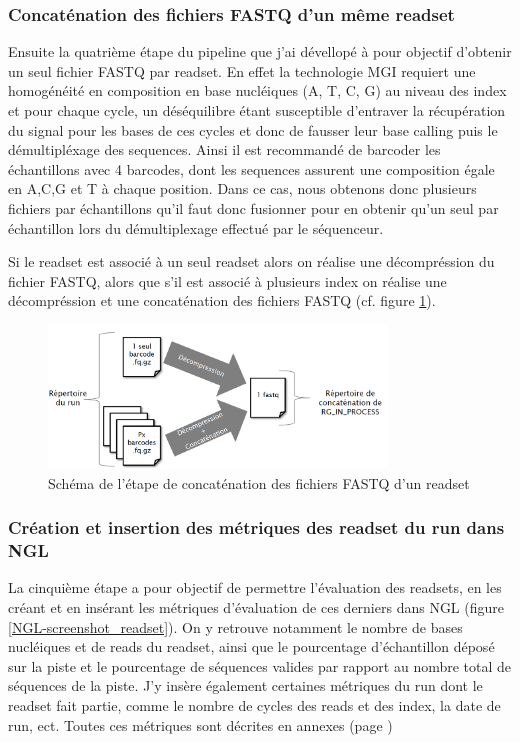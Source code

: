 \subsubsection*{Concaténation des fichiers FASTQ d'un même readset}
Ensuite la quatrième étape du pipeline que j'ai dévellopé à pour objectif d'obtenir un seul fichier FASTQ par readset.
En effet la technologie MGI requiert une homogénéité en composition en base nucléiques (A, T, C, G) au niveau des index et pour chaque cycle, un déséquilibre étant susceptible d'entraver la récupération du signal pour les bases de ces cycles et donc de fausser leur base calling puis le démultipléxage des sequences.
Ainsi il est recommandé de \og barcoder \fg{} les échantillons avec 4 barcodes, dont les sequences assurent une composition égale en A,C,G et T à chaque position.
Dans ce cas, nous obtenons donc plusieurs fichiers par échantillons qu'il faut donc fusionner pour en obtenir qu'un seul par échantillon lors du démultiplexage effectué par le séquenceur.

Si le readset est associé à un seul readset alors on réalise une décompréssion du fichier FASTQ, alors que s'il est associé à plusieurs index on réalise une décompréssion et une concaténation des fichiers FASTQ (cf. figure \ref{schema-concat-fastq}).

\begin{figure}[H]
    \centering
    \includegraphics[width=0.8\textwidth]{img/Schéma_concaténation.png}
    \caption{\footnotesize{Schéma de l'étape de \og concaténation\fg{} des fichiers FASTQ d'un readset}}
    \label{schema-concat-fastq}
\end{figure}

\subsubsection*{Création et insertion des métriques des readset du run dans NGL}
La cinquième étape a pour objectif de permettre l'évaluation des readsets, en les créant et en insérant les métriques d'évaluation de ces derniers dans NGL (figure \ref{NGL-screenshot_readset}).
On y retrouve notamment le nombre de bases nucléiques et de reads du readset, ainsi que le pourcentage d'échantillon déposé sur la piste et le pourcentage de séquences valides par rapport au nombre total de séquences de la piste.
J'y insère également certaines métriques du run dont le readset fait partie, comme le nombre de cycles des reads et des index, la date de run, ect. Toutes ces métriques sont décrites en annexes (page \pageref{anexes3})\\


